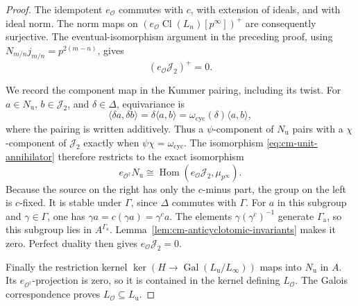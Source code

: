 \begin{proof}
The idempotent \(e_{\mathcal O}\) commutes with \(c\), with
extension of ideals, and with ideal norm.
The norm maps on
\((e_{\mathcal O}\operatorname{Cl}(L_n)[p^\infty])^+\)
are consequently surjective.
The eventual-isomorphism argument in the preceding proof,
using \(N_{m/n}j_{m/n}=p^{2(m-n)}\), gives
\[
                      (e_{\mathcal O}\mathcal J_2)^+=0.
\]

We record the component map in the Kummer pairing, including
its twist.  For \(a\in N_{\mathrm u}\),
\(b\in\mathcal J_2\), and \(\delta\in\Delta\), equivariance is
\[
              \langle\delta a,\delta b\rangle
                    =\delta\langle a,b\rangle
                    =\omega_{\mathrm{cyc}}(\delta)
                                         \langle a,b\rangle,
\]
where the pairing is written additively.
Thus a \(\psi\)-component of \(N_{\mathrm u}\) pairs with a
\(\chi\)-component of \(\mathcal J_2\) exactly when
\(\psi\chi=\omega_{\mathrm{cyc}}\).
The isomorphism \eqref{eq:cm-unit-annihilator} therefore
restricts to the exact isomorphism
\[
 e_{\mathcal O^\dagger}N_{\mathrm u}
       \cong
 \operatorname{Hom}(e_{\mathcal O}\mathcal J_2,
                                      \mu_{p^\infty}).
\]
Because the source on the right has only the \(c\)-minus part,
the group on the left is \(c\)-fixed.
It is stable under \(\Gamma\), since \(\Delta\) commutes with
\(\Gamma\).
For \(a\) in this subgroup and \(\gamma\in\Gamma\), one has
\(\gamma a=c(\gamma a)=\gamma^c a\).
The elements \(\gamma(\gamma^c)^{-1}\) generate
\(\Gamma_{\mathrm a}\), so this subgroup lies in
\(A^{\Gamma_{\mathrm a}}\).
Lemma~\ref{lem:cm-anticyclotomic-invariants} makes it zero.
Perfect duality then gives \(e_{\mathcal O}\mathcal J_2=0\).

Finally the restriction kernel
\(\ker(H\to\operatorname{Gal}(L_{\mathrm u}/L_\infty))\)
maps into \(N_{\mathrm u}\) in \(A\).
Its \(e_{\mathcal O^\dagger}\)-projection is zero, so it is
contained in the kernel defining \(L_{\mathcal O}\).
The Galois correspondence proves
\(L_{\mathcal O}\subseteq L_{\mathrm u}\).
\end{proof}
